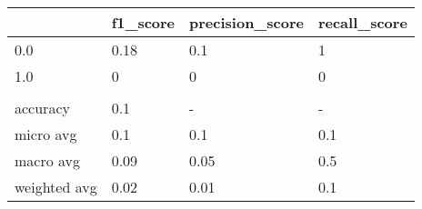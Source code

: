 \begin{tabular}{llll}
\toprule
{} & f1\_score & precision\_score & recall\_score \\
\midrule
0.0          &     0.18 &             0.1 &            1 \\
1.0          &        0 &               0 &            0 \\
             &          &                 &              \\
accuracy     &      0.1 &               - &            - \\
micro avg    &      0.1 &             0.1 &          0.1 \\
macro avg    &     0.09 &            0.05 &          0.5 \\
weighted avg &     0.02 &            0.01 &          0.1 \\
\bottomrule
\end{tabular}

